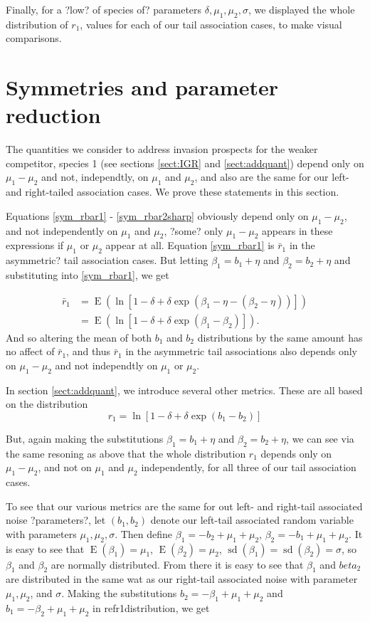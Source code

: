 \documentclass[letterpaper,11pt]{article}
\DeclareMathOperator{\EX}{E}%
\DeclareMathOperator{\sd}{sd}
\begin{document}
Finally, for a ?low? of species of? parameters $\delta, \mu_1, \mu_2, \sigma$, we displayed the whole distribution of $r_1$, values for each of our tail association cases, to make visual comparisons. 

\section{Symmetries and parameter reduction}

The quantities we consider to address invasion prospects for the weaker competitor, species 1 (see sections \ref{sect:IGR} and \ref{sect:addquant}) depend only on $\mu_1-\mu_2$ and not, independtly, on $\mu_1$ and $\mu_2$, and also are the same for our left- and right-tailed association cases. We prove these statements in this section.

Equations \ref{sym_rbar1} - \ref{sym_rbar2sharp} obviously depend only on $\mu_1-\mu_2$, and not independently on $\mu_1$ and $\mu_2$, ?some? only $\mu_1-\mu_2$ appears in these expressions if $\mu_1$ or $\mu_2$ appear at all. Equation \ref{sym_rbar1} is $\bar r_1$ in the asymmetric? tail association cases. But letting $\beta_1 = b_1 + \eta$ and $\beta_2 = b_2 + \eta$ and substituting into \ref{sym_rbar1}, we get 

\begin{align}
\bar r_1 &= \EX(\ln[1-\delta+\delta \exp(\beta_1-\eta-(\beta_2-\eta))])\\
&= \EX(\ln[1-\delta+\delta \exp(\beta_1-\beta_2)]).
\end{align}
\noindent And so altering the mean of both $b_1$ and $b_2$ distributions by the same amount has no affect of $\bar r_1$, and thus $\bar r_1$ in the asymmetric tail associations also depends only on $\mu_1 - \mu_2$ and not independtly on $\mu_1$ or $\mu_2$.

In section \ref{sect:addquant}, we introduce several other metrics. These are all based on the distribution 
\begin{equation}
r_1=\ln[1-\delta+\delta \exp(b_1-b_2)] \label{r1distribution}
\end{equation}

\noindent But, again making the substitutions $\beta_1 = b_1 + \eta$ and $\beta_2 = b_2 + \eta$, we can see via the same resoning as above that the whole distribution $r_1$ depends only on $\mu_1 - \mu_2$, and not on $\mu_1$ and $\mu_2$ independently, for all three of our tail association cases.

To see that our various metrics are the same for out left- and right-tail associated noise ?parameters?, let $(b_1,b_2)$ denote our left-tail associated random variable with parameters $\mu_1,\mu_2,\sigma$. Then define $\beta_1 = -b_2 + \mu_1 +\mu_2$, $\beta_2=-b_1+\mu_1+\mu_2$. It is easy to see that $\EX(\beta_1)=\mu_1$, $\EX(\beta_2)=\mu_2$, $\sd(\beta_1)=\sd(\beta_2)=\sigma$, so $\beta_1$ and $\beta_2$ are normally distributed. From there it is easy to see that $\beta_1$ and $beta_2$ are distributed in the same wat as our right-tail associated noise with parameter $\mu_1,\mu_2$, and $\sigma$. Making the substitutions $b_2 = -\beta_1 + \mu_1 + \mu_2$ and $b_1 = -\beta_2 + \mu_1+\mu_2$ in ref{r1distribution}, we get
\end{document}
